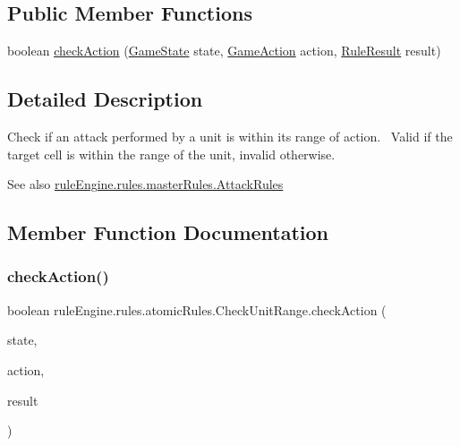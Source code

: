 \subsection*{Public Member Functions}
\begin{DoxyCompactItemize}
\item 
boolean \mbox{\hyperlink{classrule_engine_1_1rules_1_1atomic_rules_1_1_check_unit_range_a60608d1853c7963772dd07ba32733d11}{check\+Action}} (\mbox{\hyperlink{classgame_1_1game_state_1_1_game_state}{Game\+State}} state, \mbox{\hyperlink{classrule_engine_1_1_game_action}{Game\+Action}} action, \mbox{\hyperlink{classrule_engine_1_1_rule_result}{Rule\+Result}} result)
\end{DoxyCompactItemize}


\subsection{Detailed Description}
Check if an attack performed by a unit is within its range of action.~\newline
 Valid if the target cell is within the range of the unit, invalid otherwise.

\begin{DoxySeeAlso}{See also}
\mbox{\hyperlink{classrule_engine_1_1rules_1_1master_rules_1_1_attack_rules}{rule\+Engine.\+rules.\+master\+Rules.\+Attack\+Rules}} 
\end{DoxySeeAlso}


\subsection{Member Function Documentation}
\mbox{\label{classrule_engine_1_1rules_1_1atomic_rules_1_1_check_unit_range_a60608d1853c7963772dd07ba32733d11}} 
\subsubsection{\texorpdfstring{check\+Action()}{checkAction()}}
{\footnotesize\ttfamily boolean rule\+Engine.\+rules.\+atomic\+Rules.\+Check\+Unit\+Range.\+check\+Action (\begin{DoxyParamCaption}\item[{\mbox{\hyperlink{classgame_1_1game_state_1_1_game_state}{Game\+State}}}]{state,  }\item[{\mbox{\hyperlink{classrule_engine_1_1_game_action}{Game\+Action}}}]{action,  }\item[{\mbox{\hyperlink{classrule_engine_1_1_rule_result}{Rule\+Result}}}]{result }\end{DoxyParamCaption})\hspace{0.3cm}{\ttfamily [inline]}}



